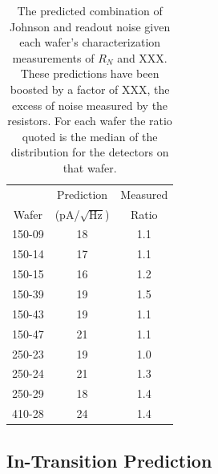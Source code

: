 \begin{table}[ht!]
\begin{center}
\begin{tabular}{| c | c | c |}
\hline  
           & Prediction           & Measured   \\
Wafer & (pA/$\sqrt{\mathrm{Hz}}$) & Ratio  \\
\hline 150-09 & 18 &  1.1 \\ 
\hline 150-14 & 17 &  1.1 \\ 
\hline 150-15 & 16 &  1.2 \\ 
\hline 150-39 & 19 &  1.5 \\ 
\hline 150-43 & 19 &  1.1 \\
\hline 150-47 & 21 &  1.1 \\
\hline 250-23 & 19 &  1.0 \\ 
\hline 250-24 & 21 &  1.3 \\ 
\hline 250-29 & 18 &  1.4 \\
\hline 410-28 & 24 &  1.4 \\
\hline
\end{tabular}
\end{center}
\caption[Median overbiased NEP predictions and measurements for each wafer]{The predicted combination of Johnson and readout noise given each wafer's characterization measurements of $R_{N}$ and XXX. These predictions have been boosted by a factor of XXX, the excess of noise measured by the resistors. For each wafer the ratio quoted is  the median of the distribution for the detectors on that wafer. 
\label{tab:overbias_noise_table} }
\end{table}

\subsection{In-Transition Prediction}
\label{sec:in_trans_pred}

